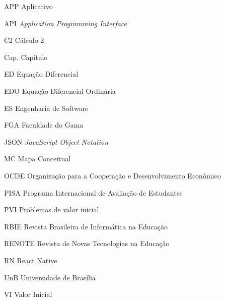 \begin{siglas}
  \item[APP] Aplicativo
  \item[API] \textit{Application Programming Interface}
  \item[C2] Cálculo 2
  \item[Cap.] Capítulo
  \item[ED] Equação Diferencial
  \item[EDO] Equação Diferencial Ordinária
  \item[ES] Engenharia de Software
  \item[FGA] Faculdade do Gama
  \item[JSON] \textit{JavaScript Object Notation}
  \item[MC] Mapa Conceitual
  \item[OCDE] Organização para a Cooperação e Desenvolvimento Econômico
  \item[PISA] Programa Internacional de Avaliação de Estudantes
  \item[PVI] Problemas de valor inicial
  \item[RBIE] Revista Brasileira de Informática na Educação
  \item[RENOTE] Revista de Novas Tecnologias na Educação
  \item[RN] React Native
  \item[UnB] Universidade de Brasília
  \item[VI] Valor Inicial
\end{siglas}
